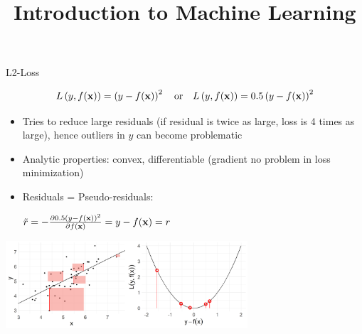 \documentclass[11pt,compress,t,notes=noshow, xcolor=table]{beamer}
\title{Introduction to Machine Learning}
\institute{\href{https://compstat-lmu.github.io/lecture_i2ml/}{compstat-lmu.github.io/lecture\_i2ml}}
\date{}
\begin{document}

\begin{vbframe}{L2-Loss}

\vspace*{-0.5cm}

$$
L\left(y, f(\mathbf{x})\right) = \left(y-f(\mathbf{x})\right)^2 \quad \text{or} \quad L\left(y, f(\mathbf{x})\right) = 0.5 \left(y-f(\mathbf{x})\right)^2
$$

\vspace*{-2mm}

\begin{itemize}
\item Tries to reduce large residuals (if residual is twice as large, loss is 4 times as large), hence outliers in $y$ can become problematic
\item Analytic properties: convex, differentiable (gradient no problem in loss minimization)
\item Residuals = Pseudo-residuals: \begin{footnotesize} $\tilde r = - \frac{\partial{0.5 (y-f(\mathbf{x}))^2}}{\partial f(\mathbf{x})} = y - f(\mathbf{x}) = r$\end{footnotesize}
\end{itemize}






\begin{center}
  \includegraphics[width = 9cm]{figure/loss_quadratic_2.png} \\
\end{center}

\end{vbframe}
\end{document}
